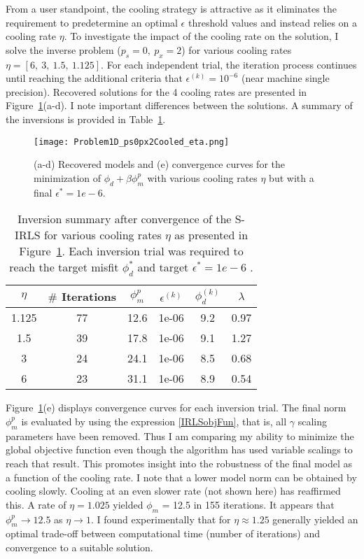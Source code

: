 From a user standpoint, the cooling strategy is attractive as it eliminates the requirement to predetermine an optimal $\epsilon$ threshold values and instead relies on a cooling rate $\eta$.
To investigate the impact of the cooling rate on the solution, I solve the inverse problem ($p_s=0,\: p_x=2$) for various cooling rates $\eta=[6,\:3,\:1.5,\:1.125]$.
For each independent trial, the iteration process continues until reaching the additional criteria that $\epsilon^{(k)} = 10^{-6}$ (near machine single precision).
Recovered solutions for the 4 cooling rates are presented in Figure~\ref{Mixed1DCooledEta}(a-d). I note important differences between the solutions. A summary of the inversions is provided in Table~\ref{table:Cooling}.
\begin{figure}
\texttt{[image: Problem1D\_ps0px2Cooled\_eta.png]}
\caption{(a-d) Recovered models and (e) convergence curves for the minimization of $\phi_d +\beta \phi_m^p$ with various cooling rates $\eta$ but with a final $\epsilon^* = 1e-6$.
}
\label{Mixed1DCooledEta}
\end{figure}
\begin{table}
\centering
\begin{tabular}{| c | c | c | c | c | c |} \hline
$\eta$ & $\#$ Iterations &$\phi_m^{p} $& $\epsilon^{(k)}$ & $\phi_d^{(k)}$ & $\lambda$ \\ \hline
1.125 	& 77	& 12.6 & 1e-06& 9.2& 0.97\\
1.5 		&39		& 17.8 & 1e-06& 9.1& 1.27\\
3 		&24		& 24.1 & 1e-06& 8.5& 0.68\\
6 		&23		& 31.1 & 1e-06& 8.9& 0.54\\ \hline
\end{tabular}
\caption{Inversion summary after convergence of the S-IRLS for various cooling rates $\eta$ as presented in Figure~\ref{Mixed1DCooledEta}. Each inversion trial was required to reach the target misfit $\phi_d^*$ and target $\epsilon^* =
1e-6$ .}
\label{table:Cooling}
\end{table}

Figure~\ref{Mixed1DCooledEta}(e) displays convergence curves for each inversion trial. The final norm $\phi_m^p$ is evaluated by using the expression \eqref{IRLSobjFun}, that is, all $\gamma$ scaling parameters have been removed. Thus I am comparing my ability to minimize the global objective function even though the algorithm has used variable scalings to reach that result. This promotes insight into the robustness of the final model as a function of the cooling rate.
I note that a lower model norm can be obtained by cooling slowly. Cooling at an even slower rate (not shown here) has reaffirmed this. A rate of $\eta=1.025$ yielded $\phi_m$ = 12.5 in 155 iterations. It appears that $\phi_m^p \rightarrow 12.5$ as $\eta \rightarrow 1$.
I found experimentally that for $\eta \approx 1.25$ generally yielded an optimal trade-off between computational time (number of iterations) and convergence to a suitable solution.

